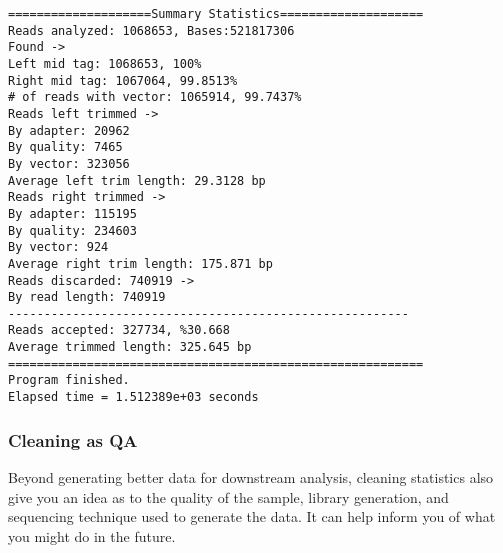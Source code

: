 \documentclass[pdf]{beamer}
\begin{document}
\begin{frame}[fragile]
\begin{scriptsize}
\begin{verbatim}
====================Summary Statistics====================
Reads analyzed: 1068653, Bases:521817306
Found ->
Left mid tag: 1068653, 100%
Right mid tag: 1067064, 99.8513%
# of reads with vector: 1065914, 99.7437%
Reads left trimmed ->
By adapter: 20962
By quality: 7465
By vector: 323056
Average left trim length: 29.3128 bp
Reads right trimmed ->
By adapter: 115195
By quality: 234603
By vector: 924
Average right trim length: 175.871 bp
Reads discarded: 740919 ->
By read length: 740919
--------------------------------------------------------
Reads accepted: 327734, %30.668
Average trimmed length: 325.645 bp
==========================================================
Program finished.
Elapsed time = 1.512389e+03 seconds
\end{verbatim}
\end{scriptsize}
\end{frame}

\begin{frame}
\frametitle{Cleaning as QA}
Beyond generating better data for downstream analysis, cleaning statistics also give you an idea as to the quality of the sample, library generation, and sequencing technique used to generate the data. It can help inform you of what you might do in the future.
\end{frame}
\end{document}
